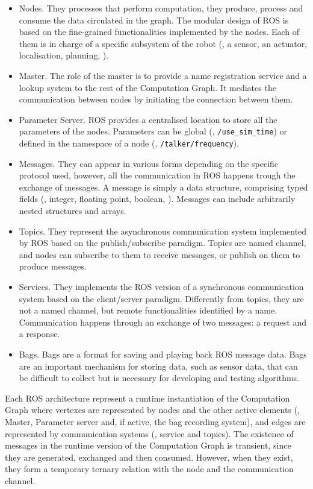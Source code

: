 \begin{itemize}
\item Nodes. They processes that perform computation, they produce, process and consume the data circulated in the graph. The modular design of ROS is based on the fine-grained functionalities implemented by the nodes. Each of them is in charge of a specific subsystem of the robot (\eg, a sensor, an actuator, localisation, planning, \etc). 
\item Master. The role of the master is to provide a name registration service and a lookup system to the rest of the Computation Graph. It mediates the communication between nodes by initiating the connection between them. 
\item Parameter Server. ROS provides a centralised location to store all the parameters of the nodes. Parameters can be global (\eg, \texttt{/use\_sim\_time}) or defined in the namespace of a node (\eg, \texttt{/talker/frequency}).
\item Messages. They can appear in various forms depending on the specific protocol used, however, all the communication in ROS happens trough the exchange of messages. A message is simply a data structure, comprising typed fields (\eg, integer, floating point, boolean, \etc). Messages can include arbitrarily nested structures and arrays.
\item Topics. They represent the asynchronous communication system implemented by ROS based on the publish/subscribe paradigm. Topics are named channel, and nodes can subscribe to them to receive messages, or publish on them to produce messages.
\item Services. They implements the ROS version of a synchronous communication system based on the client/server paradigm. Differently from topics, they are not a named channel, but remote functionalities identified by a name. Communication happens through an exchange of two messages: a request and a response.
\item Bags. Bags are a format for saving and playing back ROS message data. Bags are an important mechanism for storing data, such as sensor data, that can be difficult to collect but is necessary for developing and testing algorithms. 
\end{itemize}

Each ROS architecture represent a runtime instantiation of the Computation Graph where vertexes are represented by nodes and the other active elements (\ie, Master, Parameter server and, if active, the bag recording system), and edges are represented by communication systems (\ie, service and topics). The existence of messages in the runtime version of the Computation Graph is transient, since they are generated, exchanged and then consumed. However, when they exist, they form a temporary ternary relation with the node and the communication channel.

